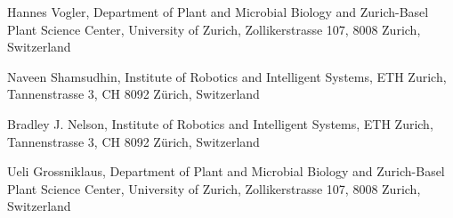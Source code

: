 Hannes Vogler, Department of Plant and Microbial Biology and Zurich-Basel Plant Science Center, University of Zurich, Zollikerstrasse 107, 8008 Zurich, Switzerland

Naveen Shamsudhin, Institute of Robotics and Intelligent Systems, ETH Zurich, Tannenstrasse 3, CH 8092 Zürich, Switzerland

Bradley J. Nelson, Institute of Robotics and Intelligent Systems, ETH Zurich, Tannenstrasse 3, CH 8092 Zürich, Switzerland

Ueli Grossniklaus, Department of Plant and Microbial Biology and Zurich-Basel Plant Science Center, University of Zurich, Zollikerstrasse 107, 8008 Zurich, Switzerland